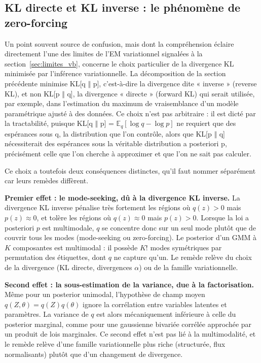 \subsection{KL directe et KL inverse : le phénomène de zero-forcing}\label{sec:kl_inverse}
Un point souvent source de confusion, mais dont la compréhension éclaire directement l'une des limites de l'EM variationnel signalées à la section~\ref{sec:limites_vb}, concerne le choix particulier de la divergence KL minimisée par l'inférence variationnelle. La décomposition de la section précédente minimise KL[q $\Vert $ p], c'est-à-dire la divergence dite « inverse » (reverse KL), et non KL[p $\Vert $ q], la divergence « directe » (forward KL) qui serait utilisée, par exemple, dans l'estimation du maximum de vraisemblance d'un modèle paramétrique ajusté à des données. Ce choix n'est pas arbitraire : il est dicté par la tractabilité, puisque KL[q $\Vert $ p] = $\mathbb{E}_q[\log q - \log p]$ ne requiert que des espérances sous q, la distribution que l'on contrôle, alors que KL[p $\Vert $ q] nécessiterait des espérances sous la véritable distribution a posteriori p, précisément celle que l'on cherche à approximer et que l'on ne sait pas calculer.

Ce choix a toutefois deux conséquences distinctes, qu'il faut nommer séparément car leurs remèdes diffèrent.

\textbf{Premier effet : le mode-seeking, dû à la divergence KL inverse. }La divergence KL inverse pénalise très fortement les régions où $q(z) > 0$ mais $p(z) \approx 0$, et tolère les régions où $q(z) \approx 0$ mais $p(z) > 0$. Lorsque la loi a posteriori $p$ est multimodale, $q$ se concentre donc sur un seul mode plutôt que de couvrir tous les modes (mode-seeking ou zero-forcing). Le posterior d'un GMM à $K$ composantes est multimodal : il possède $K!$ modes symétriques par permutation des étiquettes, dont $q$ ne capture qu'un. Le remède relève du choix de la divergence (KL directe, divergences $\alpha$) ou de la famille variationnelle.

\textbf{Second effet : la sous-estimation de la variance, due à la factorisation. }Même pour un posterior unimodal, l'hypothèse de champ moyen $q(Z, \theta) = q(Z)q(\theta)$ ignore la corrélation entre variables latentes et paramètres. La variance de $q$ est alors mécaniquement inférieure à celle du posterior marginal, comme pour une gaussienne bivariée corrélée approchée par un produit de lois marginales. Ce second effet n'est pas lié à la multimodalité, et le remède relève d'une famille variationnelle plus riche (structurée, flux normalisants) plutôt que d'un changement de divergence.

